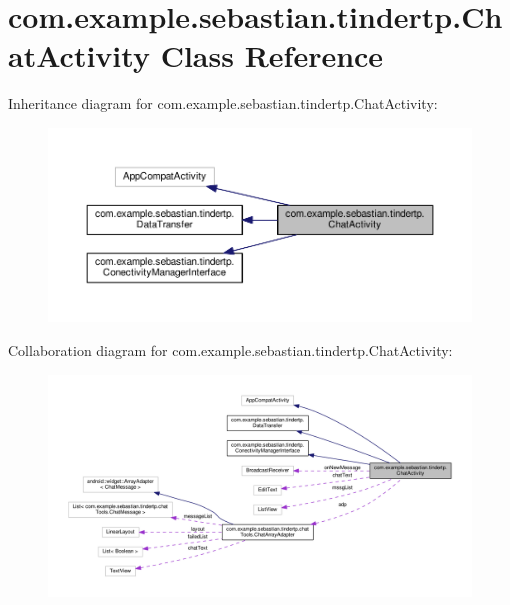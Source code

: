 \hypertarget{classcom_1_1example_1_1sebastian_1_1tindertp_1_1ChatActivity}{}\section{com.\+example.\+sebastian.\+tindertp.\+Chat\+Activity Class Reference}
\label{classcom_1_1example_1_1sebastian_1_1tindertp_1_1ChatActivity}


Inheritance diagram for com.\+example.\+sebastian.\+tindertp.\+Chat\+Activity\+:\nopagebreak
\begin{figure}[H]
\begin{center}
\leavevmode
\includegraphics[width=350pt]{classcom_1_1example_1_1sebastian_1_1tindertp_1_1ChatActivity__inherit__graph}
\end{center}
\end{figure}


Collaboration diagram for com.\+example.\+sebastian.\+tindertp.\+Chat\+Activity\+:\nopagebreak
\begin{figure}[H]
\begin{center}
\leavevmode
\includegraphics[width=350pt]{classcom_1_1example_1_1sebastian_1_1tindertp_1_1ChatActivity__coll__graph}
\end{center}
\end{figure}
